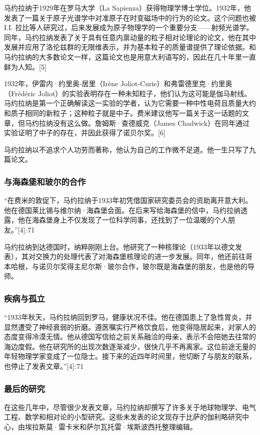 马约拉纳于1929年在罗马大学（La Sapienza）获得物理学博士学位。1932年，他发表了一篇关于原子光谱学中对准原子在时变磁场中的行为的论文。这个问题也被I.I. 拉比等人研究过，后来发展成为原子物理学的一个重要分支——射频光谱学。同年，马约拉纳发表了关于具有任意内禀动量的粒子相对论理论的论文，他在其中发展并应用了洛伦兹群的无限维表示，并为基本粒子的质量谱提供了理论依据。和马约拉纳的大多数论文一样，这篇论文也是用意大利语写的，因此在几十年里一直鲜为人知。[5]

1932年，伊雷内·约里奥-居里（Irène Joliot-Curie）和弗雷德里克·约里奥（Frédéric Joliot）的实验表明存在一种未知粒子，他们认为这可能是伽马射线。马约拉纳是第一个正确解读这一实验的学者，认为它需要一种中性电荷且质量大约和质子相同的新粒子；这种粒子就是中子。费米建议他写一篇关于这一话题的文章，但马约拉纳没有这么做。詹姆斯·查德威克（James Chadwick）在同年通过实验证明了中子的存在，并因此获得了诺贝尔奖。[6]

马约拉纳以不追求个人功劳而著称，他认为自己的工作微不足道。他一生只写了九篇论文。
\subsubsection{与海森堡和玻尔的合作}
“在费米的敦促下，马约拉纳于1933年初凭借国家研究委员会的资助离开意大利。他在德国莱比锡与维尔纳·海森堡会面。在后来写给海森堡的信中，马约拉纳透露，他在海森堡身上不仅发现了一位科学同事，还找到了一位温暖的个人朋友。”[4]: 71 

马约拉纳到达德国时，纳粹刚刚上台。他研究了一种核理论（1933年以德文发表），其对交换力的处理代表了对海森堡核理论的进一步发展。同年，他还前往哥本哈根，与诺贝尔奖得主尼尔斯·玻尔合作，玻尔既是海森堡的朋友，也是他的导师。
\subsubsection{疾病与孤立}
“1933年秋天，马约拉纳回到罗马，健康状况不佳。他在德国患上了急性胃炎，并显然遭受了神经衰弱的折磨。遵医嘱实行严格饮食后，他变得隐居起来，对家人的态度变得冷漠无情。他从德国写信给之前关系融洽的母亲，表示不会陪她去往常的海边度假。他在研究所的出现次数逐渐减少，很快几乎不再离家。这位前途无量的年轻物理学家变成了一位隐士。接下来的近四年时间里，他切断了与朋友的联系，也停止了发表文章。”[4]: 71 
\subsubsection{最后的研究}
在这些几年中，尽管很少发表文章，马约拉纳却撰写了许多关于地球物理学、电气工程、数学和相对论的小型研究。这些未发表的论文现存于比萨的伽利略研究中心，由埃拉斯莫·雷卡米和萨尔瓦托雷·埃斯波西托整理编辑。

